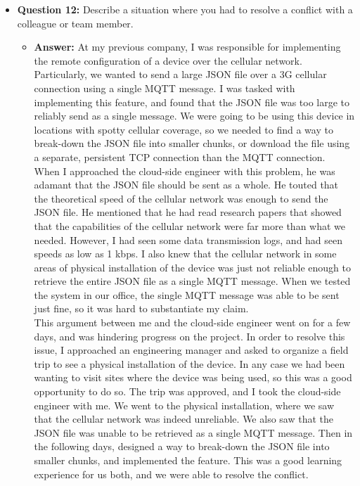 \documentclass{article}
\begin{document}
\begin{itemize}
    \item \textbf{Question 12:} Describe a situation where you had to resolve a conflict with a colleague or team member.
    \begin{itemize}
        \item \textbf{Answer:} At my previous company, I was responsible for 
        implementing the remote configuration of a device over the cellular
        network. Particularly, we wanted to send a large JSON file over a 
        3G cellular connection using a single MQTT message.
        I was tasked with implementing this feature,
        and found that the JSON file was too large to reliably send as
        a single message. We were going to be using this device in
        locations with spotty cellular coverage, so we needed to find a
        way to break-down the JSON file into smaller chunks, or download
        the file using a separate, persistent TCP connection than the MQTT
        connection.\\

        When I approached the cloud-side engineer with this problem, he
        was adamant that the JSON file should be sent as a whole. He touted that
        the theoretical speed of the cellular network was enough to send
        the JSON file. He mentioned that he had read research papers
        that showed that the capabilities of the cellular network were
        far more than what we needed. However, I had seen some data transmission
        logs, and had seen speeds as low as 1 kbps. I also knew that the
        cellular network in some areas of physical installation of the device
        was just not reliable enough to retrieve the entire JSON file as a single
        MQTT message. When we tested the system in our office, the single
        MQTT message was able to be sent just fine, so it was hard to substantiate
        my claim.\\

        This argument between me and the cloud-side engineer went on for
        a few days, and was hindering progress on the project.
        In order to resolve this issue, I approached an engineering manager and
        asked to organize a field trip to see a physical installation of the device.
        In any case we had been wanting to visit sites where the device was
        being used, so this was a good opportunity to do so.
        The trip was approved, and I took the cloud-side engineer with me.
        We went to the physical installation, where we saw that the cellular
        network was indeed unreliable. We also saw that the JSON file was
        unable to be retrieved as a single MQTT message. Then in the following days,
        designed a way to break-down the JSON file into smaller chunks,
        and implemented the feature. This was a good learning experience for us
        both, and we were able to resolve the conflict.
    \end{itemize}
    

\end{itemize}
\end{document}

